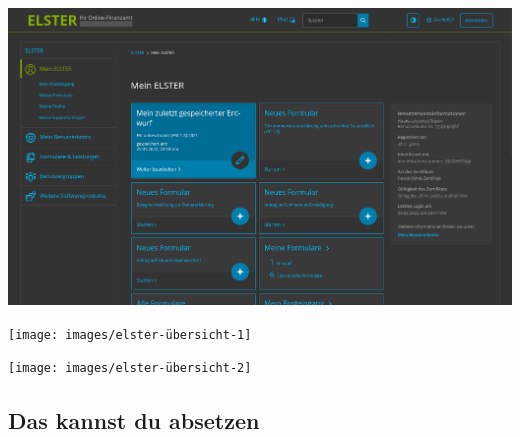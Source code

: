 \documentclass{beamer}
\begin{document}
			\begin{frame}
				\begin{center}
					\vspace{-0.6cm}
					\hspace*{-0.91cm}
					\includegraphics[scale=0.24]{images/elster-1}
				\end{center}
			\end{frame}
		
			\begin{frame}
				\begin{center}
					\vspace{-0.6cm}
					\hspace*{-0.91cm}
					\texttt{[image: images/elster-übersicht-1]}
				\end{center}
			\end{frame}
		
			\begin{frame}
				\begin{center}
					\vspace{-0.6cm}
					\hspace*{-0.91cm}
					\texttt{[image: images/elster-übersicht-2]}
				\end{center}
			\end{frame}
		
		\subsection{Das kannst du absetzen}
			
\end{document}
